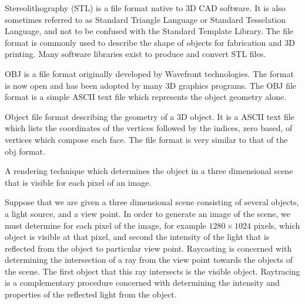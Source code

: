 

{%
Stereolithography (STL) is a file format native to 3D CAD software.
It is also sometimes referred to as Standard Triangle Language or Standard Tesselation Language, and not to be confused with the Standard Template Library.
The file format is commonly used to describe the shape of objects for fabrication and 3D printing.
Many software libraries exist to produce and convert STL files.
}

{
    OBJ is a file format originally developed by Wavefront technologies.
    The format is now open and has been adopted by many 3D graphics programs.
    The OBJ file format is a simple ASCII text file which represents the object geometry alone.
}

{%
Object file format describing the geometry of a 3D object.
It is a ASCII text file which lists the coordinates of the vertices followed by the indices, zero based, of vertices which compose each face.
The file format is very similar to that of the \gls{obj} format.
}

{%
    A rendering technique which determines the object in a three dimensional scene that is visible for each pixel of an image.

    Suppose that we are given a three dimensional scene consisting of several objects, a light source, and a view point.
    In order to generate an image of the scene, we must determine for each pixel of the image, for example \( 1280 \times 1024\) pixels, which object is visible at that pixel, and second the intensity of the light that is reflected from the object to particular view point.
    Raycasting is concerned with determining the intersection of a ray from the view point towards the objects of the scene.
    The first object that this ray intersects is the visible object.
    Raytracing is a complementary procedure concerned with determining the intensity and properties of the reflected light from the object.
}

